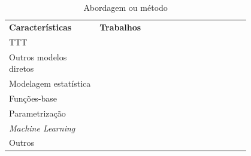 \begin{table}[H]
	\def\seleccite{\bfseries}
	\centering
	\caption{Abordagem ou método}
	\label{table:cp_classif_metodo}
	\begin{tabular}{C{0.3\linewidth} C{0.5\linewidth}}
		\textbf{Características} & \textbf{Trabalhos} \\
		\ttline
		TTT & 
		\cite{bao_online_2020}
		\cite{djikpesse_reducing_2010}
		\cite{goyal_ultrasound_2025}
		\cite{gras_practical_2022}
		\cite{othmani_acoustic_2024}
		\cite{shin_distributed_2022}
		\cite{wo_firstarrival_2024}
		\cite{zhang_optimization_2023}
		\cite{mcmechan_application_1982}
		\cite{ritter_water_2010}
		\cite{takeuchi_development_1993}
		\cite{vadapalli_application_2012}
		\cite{wellington_2d_2015}
		\\\tline
		Outros modelos diretos &
		\cite{gras_practical_2022}
		\cite{li_multiscale_2024}
		\cite{chapeland_highresolution_2022}
		\cite{datta_fast_2019}
		\cite{deluca_simultaneous_2022}
		\cite{mallick_prediction_2022}
		\cite{michalopoulou_environmental_2018}
		\cite{wong_leastsquares_2011} 
		\cite{zhang_inversion_2016}
		\\\tline
		Modelagem estatística &
		\cite{agata_bayesian_2023}
		\cite{dosso_joint_2023}
		\\\tline
		Funções-base &
		\cite{yu_krylov_2021}
		\cite{radhakrishnan_inversion_2024}
		\cite{taroudakis_tomographic_2001}
		\\\tline
		Parametrização &  
		\cite{carriere_featureoriented_2013}
		\cite{wu_inversion_2023}
		\\\tline
		\textit{Machine Learning} &
		\cite{agata_bayesian_2023}
		\cite{jo_seismic_2023}
		\cite{jo_seismic_2024}
		\cite{mei_uncertainty_2025}
		\cite{wang_seismic_2024} 
		\cite{zhang_nonlinear_2022}
		\cite{mallick_prediction_2022}
		\\\tline
		Outros & 
		\cite{han_realtime_2014}
		\cite{amini_joint_2016}
		\cite{ashley_inverted_1998}
		\cite{becker_geoacoustic_2007}
		\cite{bender_threedimensional_2012}
		\cite{mitchell_optical_2018}
	\end{tabular}
\end{table}


